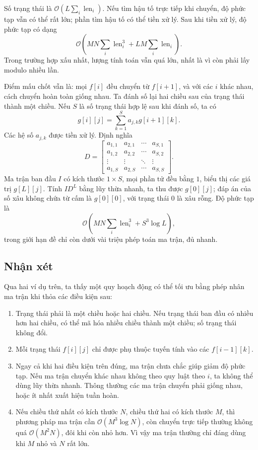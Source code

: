 \documentclass[11pt]{article}
\newcommand{\Oh}{\mathcal{O}}
\begin{document}
Số trạng thái là \(\Oh\!\left(L\sum_i \operatorname{len}_i\right)\). Nếu tìm
hậu tố trực tiếp khi chuyển, độ phức tạp vẫn có thể rất lớn; phần tìm hậu tố
có thể tiền xử lý. Sau khi tiền xử lý, độ phức tạp có dạng
\[
  \Oh\!\left(MN\sum_i \operatorname{len}_i^3
  + LM\sum_i \operatorname{len}_i\right).
\]
Trong trường hợp xấu nhất, lượng tính toán vẫn quá lớn, nhất là vì còn phải
lấy modulo nhiều lần.

Điểm mấu chốt vẫn là: mọi \(f[i]\) đều chuyển từ \(f[i+1]\), và với các \(i\)
khác nhau, cách chuyển hoàn toàn giống nhau. Ta đánh số lại hai chiều sau của
trạng thái thành một chiều. Nếu \(S\) là số trạng thái hợp lệ sau khi đánh số,
ta có
\[
  g[i][j]=\sum_{k=1}^{S} a_{j,k}g[i+1][k].
\]
Các hệ số \(a_{j,k}\) được tiền xử lý. Định nghĩa
\[
  D=
  \begin{bmatrix}
    a_{1,1}&a_{2,1}&\cdots&a_{S,1}\\
    a_{1,2}&a_{2,2}&\cdots&a_{S,2}\\
    \vdots&\vdots&\ddots&\vdots\\
    a_{1,S}&a_{2,S}&\cdots&a_{S,S}
  \end{bmatrix}.
\]
Ma trận ban đầu \(I\) có kích thước \(1\times S\), mọi phần tử đều bằng \(1\),
biểu thị các giá trị \(g[L][j]\). Tính \(ID^L\) bằng lũy thừa nhanh, ta thu
được \(g[0][j]\); đáp án của số xâu không chứa từ cấm là \(g[0][0]\), với
trạng thái \(0\) là xâu rỗng. Độ phức tạp là
\[
  \Oh\!\left(MN\sum_i \operatorname{len}_i^3+S^3\log L\right),
\]
trong giới hạn đề chỉ còn dưới vài triệu phép toán ma trận, đủ nhanh.

\subsection{Nhận xét}

Qua hai ví dụ trên, ta thấy một quy hoạch động có thể tối ưu bằng phép nhân
ma trận khi thỏa các điều kiện sau:
\begin{enumerate}
  \item Trạng thái phải là một chiều hoặc hai chiều. Nếu trạng thái ban đầu có
  nhiều hơn hai chiều, có thể mã hóa nhiều chiều thành một chiều; số trạng
  thái không đổi.
  \item Mỗi trạng thái \(f[i][j]\) chỉ được phụ thuộc tuyến tính vào các
  \(f[i-1][k]\).
  \item Ngay cả khi hai điều kiện trên đúng, ma trận chưa chắc giúp giảm độ
  phức tạp. Nếu ma trận chuyển khác nhau không theo quy luật theo \(i\), ta
  không thể dùng lũy thừa nhanh. Thông thường các ma trận chuyển phải giống
  nhau, hoặc ít nhất xuất hiện tuần hoàn.
  \item Nếu chiều thứ nhất có kích thước \(N\), chiều thứ hai có kích thước
  \(M\), thì phương pháp ma trận cần \(\Oh(M^3\log N)\), còn chuyển trực tiếp
  thường không quá \(\Oh(M^2N)\), đôi khi còn nhỏ hơn. Vì vậy ma trận thường
  chỉ đáng dùng khi \(M\) nhỏ và \(N\) rất lớn.
\end{enumerate}
\end{document}
